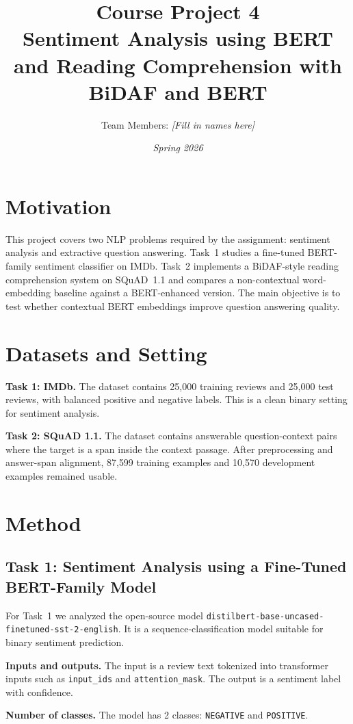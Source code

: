 \documentclass[10pt]{article}
\title{\textbf{Course Project 4}\\Sentiment Analysis using BERT and Reading Comprehension with BiDAF and BERT}
\author{Team Members: \textit{[Fill in names here]}}
\date{\textit{Spring 2026}}
\begin{document}
\maketitle

\section{Motivation}
This project covers two NLP problems required by the assignment: sentiment analysis and extractive question answering. Task~1 studies a fine-tuned BERT-family sentiment classifier on IMDb. Task~2 implements a BiDAF-style reading comprehension system on SQuAD~1.1 and compares a non-contextual word-embedding baseline against a BERT-enhanced version. The main objective is to test whether contextual BERT embeddings improve question answering quality.

\section{Datasets and Setting}
\textbf{Task 1: IMDb.} The dataset contains 25{,}000 training reviews and 25{,}000 test reviews, with balanced positive and negative labels. This is a clean binary setting for sentiment analysis.

\textbf{Task 2: SQuAD 1.1.} The dataset contains answerable question-context pairs where the target is a span inside the context passage. After preprocessing and answer-span alignment, 87{,}599 training examples and 10{,}570 development examples remained usable.

\section{Method}
\subsection{Task 1: Sentiment Analysis using a Fine-Tuned BERT-Family Model}
For Task~1 we analyzed the open-source model \texttt{distilbert-base-uncased-finetuned-sst-2-english}. It is a sequence-classification model suitable for binary sentiment prediction.

\textbf{Inputs and outputs.} The input is a review text tokenized into transformer inputs such as \texttt{input\_ids} and \texttt{attention\_mask}. The output is a sentiment label with confidence.

\textbf{Number of classes.} The model has 2 classes: \texttt{NEGATIVE} and \texttt{POSITIVE}.
\end{document}
